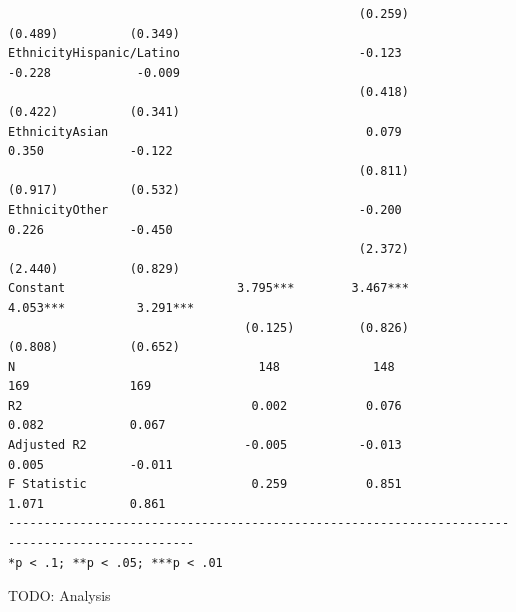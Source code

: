 \documentclass[
]{article}
\begin{document}
\begin{verbatim}
                                                 (0.259)          (0.489)          (0.349)      
EthnicityHispanic/Latino                         -0.123           -0.228            -0.009      
                                                 (0.418)          (0.422)          (0.341)      
EthnicityAsian                                    0.079            0.350            -0.122      
                                                 (0.811)          (0.917)          (0.532)      
EthnicityOther                                   -0.200            0.226            -0.450      
                                                 (2.372)          (2.440)          (0.829)      
Constant                        3.795***        3.467***         4.053***          3.291***     
                                 (0.125)         (0.826)          (0.808)          (0.652)      
N                                  148             148              169              169        
R2                                0.002           0.076            0.082            0.067       
Adjusted R2                      -0.005          -0.013            0.005            -0.011      
F Statistic                       0.259           0.851            1.071            0.861       
------------------------------------------------------------------------------------------------
*p < .1; **p < .05; ***p < .01                                                                  
\end{verbatim}

TODO: Analysis

\pagebreak
\end{document}
